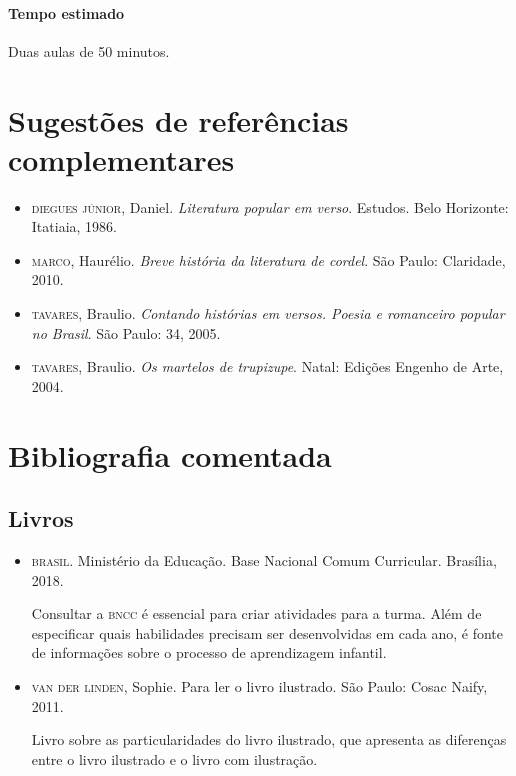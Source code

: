 \documentclass[11pt]{extarticle}
\begin{document}
\paragraph{Tempo estimado} Duas aulas de 50 minutos.

\section{Sugestões de referências complementares}


\begin{itemize}
\item \textsc{diegues júnior}, Daniel. \textit{Literatura popular em verso}. Estudos. Belo Horizonte: Itatiaia, 1986. 

\item \textsc{marco}, Haurélio. \textit{Breve história da literatura de cordel}. São Paulo: Claridade, 2010.

\item \textsc{tavares}, Braulio. \textit{Contando histórias em versos. Poesia e romanceiro popular no Brasil}. São Paulo: 34, 2005.

\item \textsc{tavares}, Braulio. \textit{Os martelos de trupizupe}. Natal: Edições Engenho de Arte, 2004.
\end{itemize}

\section{Bibliografia comentada}

\subsection{Livros}

\begin{itemize}
\item \textsc{brasil}. Ministério da Educação. Base Nacional Comum Curricular. Brasília, 2018.

Consultar a \textsc{bncc} é essencial para criar atividades para a turma. Além de especificar 
quais habilidades precisam ser desenvolvidas em cada ano, é fonte de informações sobre 
o processo de aprendizagem infantil. 

 
\item \textsc{van der linden}, Sophie. Para ler o livro ilustrado. São Paulo: Cosac Naify, 2011.

Livro sobre as particularidades do livro ilustrado, que apresenta as diferenças entre o livro ilustrado e o livro com ilustração. 
\end{itemize}
\end{document}
